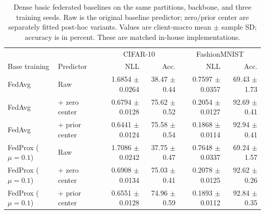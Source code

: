 \begin{table}[t]
\centering
\scriptsize
\setlength{\tabcolsep}{3.2pt}
\caption{Dense basic federated baselines on the same partitions, backbone, and three training seeds. Raw is the original baseline predictor; zero/prior center are separately fitted post-hoc variants. Values are client-macro mean $\pm$ sample SD; accuracy is in percent. These are matched in-house implementations.}
\label{tab:dense_baselines}
\begin{tabular}{llrrrr}
\toprule
& & \multicolumn{2}{c}{CIFAR-10} & \multicolumn{2}{c}{FashionMNIST} \\
Base training & Predictor & NLL & Acc. & NLL & Acc. \\
\midrule
FedAvg & Raw & 1.6854 $\pm$ 0.0264 & 38.47 $\pm$ 0.44 & 0.7597 $\pm$ 0.0357 & 69.43 $\pm$ 1.73 \\
FedAvg & + zero center & 0.6794 $\pm$ 0.0128 & 75.62 $\pm$ 0.52 & 0.2054 $\pm$ 0.0127 & 92.69 $\pm$ 0.41 \\
FedAvg & + prior center & 0.6441 $\pm$ 0.0124 & 75.58 $\pm$ 0.54 & 0.1868 $\pm$ 0.0114 & 92.94 $\pm$ 0.41 \\
FedProx ($\mu=0.1$) & Raw & 1.7086 $\pm$ 0.0242 & 37.75 $\pm$ 0.47 & 0.7648 $\pm$ 0.0337 & 69.24 $\pm$ 1.57 \\
FedProx ($\mu=0.1$) & + zero center & 0.6908 $\pm$ 0.0134 & 75.03 $\pm$ 0.41 & 0.2078 $\pm$ 0.0125 & 92.62 $\pm$ 0.26 \\
FedProx ($\mu=0.1$) & + prior center & 0.6551 $\pm$ 0.0128 & 74.96 $\pm$ 0.59 & 0.1893 $\pm$ 0.0112 & 92.84 $\pm$ 0.35 \\
\bottomrule
\end{tabular}
\end{table}
